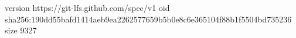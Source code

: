 version https://git-lfs.github.com/spec/v1
oid sha256:190dd55bafd1414aeb9ea2262577659b5b0e8c6e365104f88b1f5504bd735236
size 9327
